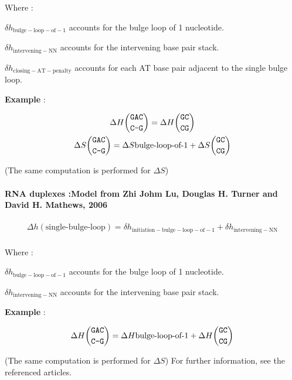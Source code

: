 \documentclass{article}
\begin{document}
Where :

$\delta{}h_\mathrm{bulge-loop-of-1}$ accounts for the bulge loop of 1 nucleotide.

$\delta{}h_\mathrm{intervening-NN}$ accounts for the intervening base pair stack.

$\delta{}h_\mathrm{closing-AT-penalty}$ accounts for each AT base pair adjacent
to the single bulge loop.

\textbf{Example} :

\begin{multline*}
\Delta H {\mbox{\texttt{GAC}} \choose \mbox{\texttt{C-G}}} =
\Delta H {\mbox{\texttt{GC}} \choose \mbox{\texttt{CG}}} \\
\Delta S {\mbox{\texttt{GAC}} \choose \mbox{\texttt{C-G}}} =
\Delta S {\mbox{bulge-loop-of-1}} +
\Delta S {\mbox{\texttt{GC}} \choose \mbox{\texttt{CG}}} \\
\end{multline*}

       (The same computation is performed for $\Delta S$) 

\paragraph{RNA duplexes :\textbf{Model from Zhi Johm Lu, Douglas H. Turner and David H. Mathews, 2006}} 

\begin{multline*}
\Delta h {(\mbox{single-bulge-loop})} =
\delta{}h_\mathrm{initiation-bulge-loop-of-1} +
\delta{}h_\mathrm{intervening-NN} \\
\end{multline*}


Where :

$\delta{}h_\mathrm{bulge-loop-of-1}$ accounts for the bulge loop of 1 nucleotide.

$\delta{}h_\mathrm{intervening-NN}$ accounts for the intervening base pair stack.


\textbf{Example} :

\begin{multline*}
\Delta H {\mbox{\texttt{GAC}} \choose \mbox{\texttt{C-G}}} =
\Delta H {\mbox{bulge-loop-of-1}} +
\Delta H {\mbox{\texttt{GC}} \choose \mbox{\texttt{CG}}} \\
\end{multline*}

       (The same computation is performed for $\Delta S$) 
For further information, see the referenced articles.
\end{document}
